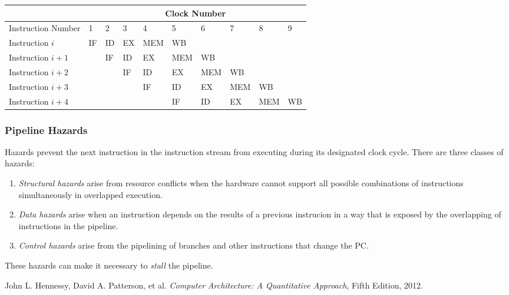 \documentclass[12pt, a4paper]{article}
\theoremstyle{margin}
\begin{document}
      \begin{table}[H]
      \centering
      \begin{tabular}{|l|l|l|l|l|l|l|l|l|l|}
      \hline
                         & \multicolumn{9}{c|}{Clock Number}               \\ \hline
      Instruction Number & 1  & 2  & 3  & 4   & 5   & 6   & 7   & 8   & 9  \\ \hline
      Instruction $i$    & IF & ID & EX & MEM & WB  &     &     &     &    \\ \hline
      Instruction $i+1$  &    & IF & ID & EX  & MEM & WB  &     &     &    \\ \hline
      Instruction $i+2$  &    &    & IF & ID  & EX  & MEM & WB  &     &    \\ \hline
      Instruction $i+3$  &    &    &    & IF  & ID  & EX  & MEM & WB  &    \\ \hline
      Instruction $i+4$  &    &    &    &     & IF  & ID  & EX  & MEM & WB \\ \hline
      \end{tabular}
      \end{table}

    \subsubsection{Pipeline Hazards}

      Hazards prevent the next instruction in the instruction stream from executing during its designated clock cycle. There are three classes of hazards\cite{caqa}:
      \begin{enumerate}
        \item \emph{Structural hazards} arise from resource conflicts when the hardware cannot support all possible combinations of instructions simultaneously in overlapped execution.
        \item \emph{Data hazards} arise when an instruction depends on the results of a previous instrucion in a way that is exposed by the overlapping of instructions in the pipeline.
        \item \emph{Control hazards} arise from the pipelining of branches and other instructions that change the PC.
      \end{enumerate}

      These hazards can make it necessary to \emph{stall} the pipeline.
      
\begin{thebibliography}{9}
    John L. Hennessy, David A. Patterson, et al.
    \emph{Computer Architecture: A Quantitative Approach},
    Fifth Edition, 2012.
\end{thebibliography}
\end{document}
